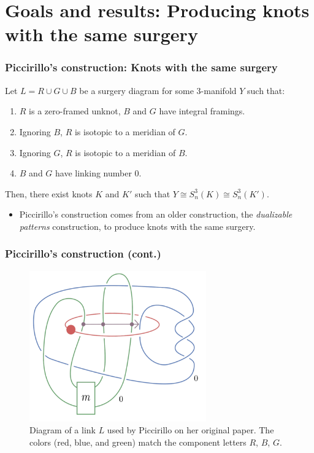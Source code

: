 \documentclass{beamer}
\theoremstyle{ex}
\theoremstyle{rem}
\begin{document}
	
\section{Goals and results: Producing knots with the same surgery}
	\begin{frame}
	\frametitle{Piccirillo's construction: Knots with the same surgery}
	\begin{theorem}[Piccirillo 2018]
		Let $L = R \cup G \cup B$ be a surgery diagram for some 3-manifold $Y$ such that:
		\begin{enumerate}
			\item $R$ is a zero-framed unknot, $B$ and $G$ have integral framings.
			\item Ignoring $B$, $R$ is isotopic to a meridian of $G$.
			\item Ignoring $G$, $R$ is isotopic to a meridian of $B$.
			\item $B$ and $G$ have linking number $0$.
		\end{enumerate}
		Then, there exist knots $K$ and $K'$ such that $Y \cong S^3_{n}(K) \cong S^3_{n}(K')$.
	\end{theorem}
	\begin{itemize}
		\item Piccirillo's construction comes from an older construction, the \textit{dualizable patterns} construction, to produce knots with the same surgery.
	\end{itemize}
\end{frame}

\begin{frame}
	\frametitle{Piccirillo's construction (cont.)}
	\begin{figure}
		\begin{center}
			\includegraphics[width=3in]{picci.png}
			\caption{Diagram of a link $L$ used by Piccirillo on her original paper. The colors (red, blue, and green) match the component letters $R$, $B$, $G$.}
		\end{center}
	\end{figure}
\end{frame}
\end{document}
